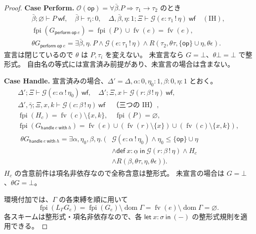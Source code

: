 \documentclass[a4paper,11pt]{article}
\theoremstyle{definition}
\newenvironment{Case}[1]{\par\smallskip\noindent\textbf{Case #1.}\enspace\ignorespaces}{\par}
\newcommand{\FV}{\operatorname{fv}}
\newcommand{\FPI}{\operatorname{fpi}}
\newcommand{\dom}{\operatorname{dom}}
\newcommand{\op}{\mathsf{op}}
\newcommand{\ops}{\mathcal O}
\newcommand{\emp}{\varnothing}
\newcommand{\gen}[3]{\mathcal G(#1:#2\,!\,#3)}
\newcommand{\Def}[3]{\mathsf{def}\ #1:#2\ \mathsf{in}\ #3}
\newcommand{\Let}[3]{\mathsf{let}\ #1:#2\ \mathsf{in}\ #3}
\newcommand{\perform}[2]{\mathsf{perform}\ #1\ #2}
\newcommand{\handle}[2]{\mathsf{handle}\ #1\ \mathsf{with}\ #2}
\newcommand{\mono}[1]{\underline{#1}}
\begin{document}
\begin{proof}
\begin{Case}{Perform}
$\ops(\op)=\forall\bar\beta.P\Rightarrow\tau_1\to\tau_2$ のとき
\begin{gather*}
 \bar\beta;\emp\vdash P\ \mathsf{wf},\quad\bar\beta\vdash\tau_i:0,\quad
 \Delta,\bar\beta,\eta:1;\Xi\vdash\gen e{\tau_1}\eta\ \mathsf{wf}\quad(\mathrm{IH}),\\
 \FPI(G_{\perform\op e})=\FPI(P)\cup\FV(e)=\FV(e),\\
 \theta G_{\perform\op e}=\exists\bar\beta,\eta.\
 P\land\gen e{\tau_1}\eta\land R(\tau_2,\theta\tau,\{\op\}\cup\eta,\theta\epsilon).
\end{gather*}
宣言は閉じているので $\theta$ は $P,\tau_i$ を変えない。
未宣言なら $G=\bot$、$\theta\bot=\bot$ で整形式。
自由名の等式には宣言済み前提があり、未宣言の場合は含まない。
\end{Case}

\begin{Case}{Handle}
宣言済みの場合、$\Delta'=\Delta,\alpha:0,\eta_0:1,\beta:0,\eta:1$ とおく。
\begin{gather*}
 \Delta';\Xi\vdash\gen e\alpha{\eta_0}\ \mathsf{wf},\quad
 \Delta';\Xi,x\vdash\gen r\beta\eta\ \mathsf{wf},\\
 \Delta',\bar\gamma;\Xi,x,k\vdash\gen c\beta\eta\ \mathsf{wf}\quad\text{（三つの IH）},\\
 \FPI(H_c)=\FV(c)\setminus\{x,k\},\quad\FPI(P)=\emp,\\
 \FPI(G_{\handle e h})=\FV(e)\cup(\FV(r)\setminus\{x\})
                         \cup(\FV(c)\setminus\{x,k\}),\\
 \begin{aligned}
 \theta G_{\handle e h}=\exists\alpha,\eta_0,\beta,\eta.\ \bigl(&
 \gen e\alpha{\eta_0}\land\eta_0\leq\{\op\}\cup\eta\\
 &\land\Def x{\mono\alpha}{\gen r\beta\eta}\land H_c\\
 &\land R(\beta,\theta\tau,\eta,\theta\epsilon)\bigr).
 \end{aligned}
\end{gather*}
$H_c$ の含意前件は項名非依存なので全称含意は整形式。
未宣言の場合は $G=\bot$、$\theta G=\bot$。
\end{Case}
環境付加では、$\Gamma$ の各束縛を順に用いて
\[
 \FPI(L_\Gamma G_e)=\FPI(G_e)\setminus\dom\Gamma
                  =\FV(e)\setminus\dom\Gamma=\emp.
\]
各スキームは整形式・項名非依存なので、各 $\Let x\sigma{(-)}$ の整形式規則を適用できる。
\end{proof}
\end{document}
